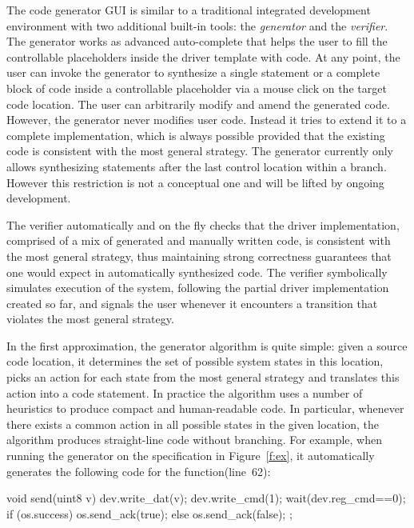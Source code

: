 The \termite code generator GUI is similar to a traditional integrated development environment with two additional built-in tools: the \emph{generator} and the \emph{verifier}.  The generator works as advanced auto-complete that helps the user to fill the controllable placeholders inside the driver template with code.  At any point, the user can invoke the generator to synthesize a single statement or a complete block of code inside a controllable placeholder via a mouse click on the target code location.  The user can arbitrarily modify and amend the generated code.  However, the generator never modifies user code.  Instead it tries to extend it to a complete implementation, which is always possible provided that the existing code is consistent with the most general strategy.  The generator currently only allows synthesizing statements after the last control location within a branch.  However this restriction is not a conceptual one and will be lifted by ongoing development.

The verifier automatically and on the fly checks that the driver implementation, comprised of a mix of generated and manually written code, is consistent with the most general strategy, thus maintaining strong correctness guarantees that one would expect in automatically synthesized code.  The verifier symbolically simulates execution of the system, following the partial driver implementation created so far, and signals the user whenever it encounters a transition that violates the most general strategy.

In the first approximation, the generator algorithm is quite simple: given a source code location, it determines the set of possible system states in this location, picks an action for each state from the most general strategy and translates this action into a code statement.  In practice the algorithm uses a number of heuristics to produce compact and human-readable code.  In particular, whenever there exists a common action in all possible states in the given location, the algorithm produces straight-line code without branching.  For example, when running the generator on the specification in Figure~\ref{f:ex}, it automatically generates the following code for the  function(line~62):

\begin{tsllisting}[keywords=, frame=single]
void send(uint8 v){
    dev.write_dat(v);
    dev.write_cmd(1);
    wait(dev.reg_cmd==0);
    if (os.success) {
        os.send_ack(true);
    } else {
        os.send_ack(false);
    };}
\end{tsllisting}

